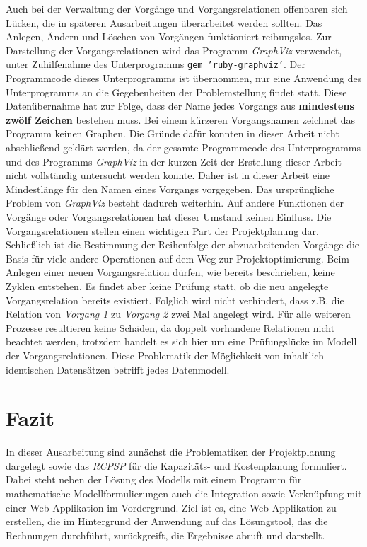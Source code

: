 \documentclass[a4paper,12pt,parskip,bibtotoc,liststotoc]{article}
\begin{document}
Auch bei der Verwaltung der Vorgänge und Vorgangsrelationen offenbaren sich Lücken, die in späteren Ausarbeitungen überarbeitet werden sollten. Das Anlegen, Ändern und Löschen von Vorgängen funktioniert reibungslos. Zur Darstellung der Vorgangsrelationen wird das Programm \textit{GraphViz} verwendet, unter Zuhilfenahme des Unterprogramms \texttt{gem 'ruby-graphviz'}. Der Programmcode dieses Unterprogramms ist übernommen, nur eine Anwendung des Unterprogramms an die Gegebenheiten der Problemstellung findet statt. Diese Datenübernahme hat zur Folge, dass der Name jedes Vorgangs aus \textbf{mindestens zwölf Zeichen} bestehen muss. Bei einem kürzeren Vorgangsnamen zeichnet das Programm keinen Graphen. Die Gründe dafür konnten in dieser Arbeit nicht abschließend geklärt werden, da der gesamte Programmcode des Unterprogramms und des Programms \textit{GraphViz} in der kurzen Zeit der Erstellung dieser Arbeit nicht vollständig untersucht werden konnte. Daher ist in dieser Arbeit eine Mindestlänge für den Namen eines Vorgangs vorgegeben. Das ursprüngliche Problem von \textit{GraphViz} besteht dadurch weiterhin. Auf andere Funktionen der Vorgänge oder Vorgangsrelationen hat dieser Umstand keinen Einfluss. Die Vorgangsrelationen stellen einen wichtigen Part der Projektplanung dar. Schließlich ist die Bestimmung der Reihenfolge der abzuarbeitenden Vorgänge die Basis für viele andere Operationen auf dem Weg zur Projektoptimierung. Beim Anlegen einer neuen Vorgangsrelation dürfen, wie bereits beschrieben, keine Zyklen entstehen. Es findet aber keine Prüfung statt, ob die neu angelegte Vorgangsrelation bereits existiert. Folglich wird nicht verhindert, dass z.B. die Relation von \textit{Vorgang 1} zu \textit{Vorgang 2} zwei Mal angelegt wird. Für alle weiteren Prozesse resultieren keine Schäden, da doppelt vorhandene Relationen nicht beachtet werden, trotzdem handelt es sich hier um eine Prüfungslücke im Modell der Vorgangsrelationen. Diese Problematik der Möglichkeit von inhaltlich identischen Datensätzen betrifft jedes Datenmodell.\\      
\newpage
\section{Fazit} \label{Fazit}
In dieser Ausarbeitung sind zunächst die Problematiken der Projektplanung dargelegt sowie das \textit{RCPSP} für die Kapazitäts- und Kostenplanung formuliert. Dabei steht neben der Lösung des Modells mit einem Programm für mathematische Modellformulierungen auch die Integration sowie Verknüpfung mit einer Web-Applikation im Vordergrund. Ziel ist es, eine Web-Applikation zu erstellen, die im Hintergrund der Anwendung auf das Lösungstool, das die Rechnungen durchführt, zurückgreift, die Ergebnisse abruft und darstellt.\\
\end{document}
